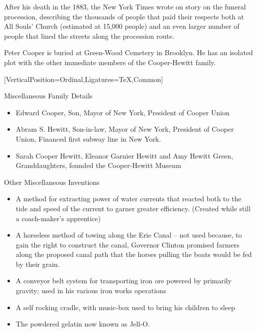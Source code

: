 \documentclass{article}
\begin{document}
\begin{minipage}[t]{0.46\linewidth}
\begin{enumList}
\item After his death in the 1883, the New York Times wrote on story on the
funeral procession, describing the { thousands of people
that paid their respects} both at All Souls' Church (estimated at 15,000 people)
and an even larger number of people that lined the streets along the procession
route.

\item Peter Cooper is buried at { Green-Wood Cemetery} in
Brooklyn. He has an isolated plot with the other immediate members of the
Cooper-Hewitt family.

\setcounter{enumTemp}{\value{enumListi}}
\end{enumList}
\end{minipage}\hfill
\begin{minipage}[t]{0.46\linewidth}
[VerticalPosition=Ordinal,Ligatures={TeX,Common}]
\fontsize{11pt}{13pt}\selectfont
\raggedright
\upshape
\begin{enumList}
\setcounter{enumListi}{\value{enumTemp}}

\item Miscellaneous Family Details
\begin{itemize}[leftmargin=*]
\item Edward Cooper, Son, Mayor of New York, President of Cooper Union
\item Abram S. Hewitt, Son-in-law, Mayor of New York, President of Cooper Union,
Financed first subway line in New York.
\item Sarah Cooper Hewitt, Eleanor Garnier Hewitt and Amy Hewitt Green,
Granddaughters, founded the Cooper-Hewitt Museum
\end{itemize}

\item Other Miscellaneous Inventions
\begin{itemize}[leftmargin=*]
\item A method for extracting power of water currents that reacted both to the
tide and speed of the current to garner greater efficiency. (Created while
still a coach-maker's apprentice)
\item A horseless method of towing along the Erie Canal -- not used because, to gain the right to construct the canal, Governor Clinton promised
farmers along the proposed canal path that the horses pulling the boats would be fed by their grain.
\item A conveyor belt system for transporting iron ore powered by
primarily gravity; used in his various iron works operations
\item A self rocking cradle, with music-box used to bring his children to sleep
\item The powdered gelatin now known as Jell-O.
\end{itemize}
\end{enumList}


\end{minipage}
\end{document}
